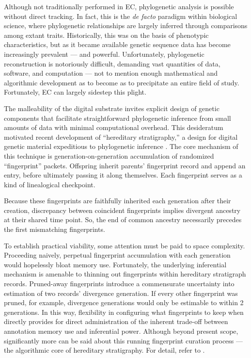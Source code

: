Although not traditionally performed in EC, phylogenetic analysis is possible without direct tracking.
In fact, this is the \textit{de facto} paradigm within biological science, where phylogenetic relationships are largely inferred through comparisons among extant traits.
Historically, this was on the basis of phenotypic characteristics, but as it became available genetic sequence data has become increasingly prevalent --- and powerful.
Unfortunately, phylogenetic reconstruction is notoriously difficult, demanding vast quantities of data, software, and computation --- not to mention enough mathematical and algorithmic development as to become as to precipitate an entire field of study.
Fortunately, EC can largely sidestep this plight.

The malleability of the digital substrate invites explicit design of genetic components that facilitate straightforward phylogenetic inference from small amounts of data with minimal computational overhead.
This desideratum motivated recent development of ``hereditary stratigraphy,'' a design for digital genetic material expeditious to phylogenetic inference \citep{moreno2022hereditary}.
The core mechanism of this technique is generation-on-generation accumulation of randomized ``fingerprint'' packets.
Offspring inherit parents' fingerprint record and append an entry, before ultimately passing it along themselves.
Each fingerprint serves as a kind of linealogical checkpoint.

Because these fingerprints are faithfully inherited each generation after their creation, discrepancy between coincident fingerprints implies divergent ancestry at their shared time point.
So, the end of common ancestry necessarily precedes the first mismatching fingerprints.

To establish practical viability, some attention must be paid to space complexity.
Proceeding naively, perpetual fingerprint accumulation with each generation would hopelessly bloat memory use.
Fortunately, the underlying inferential mechanism is amenable to thinning out fingerprints within hereditary stratigraph records.
Pruned-away fingerprints introduce a commensurate uncertainty into estimation of two records' divergence generation.
If every other fingerprint was pruned, for example, divergence generations would only be estimable to within 2 generations.
In this way, flexibility in configuring what fingerprints to keep when directly provides for direct administration of the inherent trade-off between annotation memory use and inferential power.
Although beyond present scope, significantly more can be said about this running fingerprint curation process --- the algorithmic core of hereditary stratigraphy.
For detail, refer to \citep{moreno2022hereditary}.

